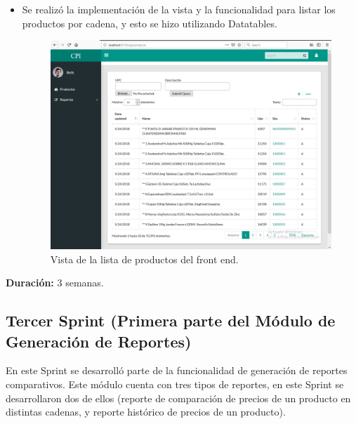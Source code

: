 \begin{itemize}
  \item Se realizó la implementación de la vista y la funcionalidad para listar los productos por cadena, y esto se hizo utilizando Datatables.
  \begin{figure}[H]
    \begin{center}
    \includegraphics[width=\textwidth]{productos.png}
    \caption{Vista de la lista de productos del front end.}
    \label{fig:products}
    \end{center}
    \end{figure}

\end{itemize}
\textbf{Duración:} 3 semanas.


\subsection{Tercer Sprint (Primera parte del Módulo de Generación de Reportes)}
En este Sprint se desarrolló parte de la funcionalidad de generación de reportes comparativos. Este módulo cuenta con tres tipos de reportes, en este Sprint se desarrollaron dos de ellos (reporte de comparación de precios de un producto en distintas cadenas, y reporte histórico de precios de un producto). 

